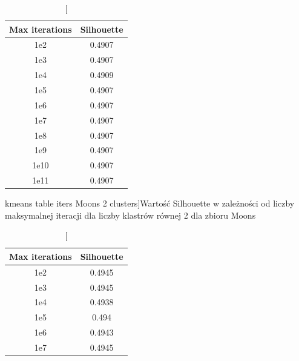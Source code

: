 \documentclass{classrep}
\begin{document}
{{%

            \begin{table}[!htbp]
                \begin{minipage}{.48\textwidth}
                    \centering
                    \begin{tabular}{|c|c|}
                        \hline
                        Max iterations & Silhouette \\ \hline
                        1e2 & 0.4907 \\ \hline
                        1e3 & 0.4907 \\ \hline
                        1e4 & 0.4909 \\ \hline
                        1e5 & 0.4907 \\ \hline
                        1e6 & 0.4907 \\ \hline
                        1e7 & 0.4907 \\ \hline
                        1e8 & 0.4907 \\ \hline
                        1e9 & 0.4907 \\ \hline
                        1e10 & 0.4907 \\ \hline
                        1e11 & 0.4907 \\ \hline
                    \end{tabular}
                    \caption
                    [kmeans table iters Moons 2 clusters]{Wartość Silhouette w
                    zależności od liczby maksymalnej iteracji dla liczby klastrów
                    równej 2 dla zbioru Moons}
                    \label{kmeans_table_iters_Moons_2_clusters}
                \end{minipage}
                \hfill
                \begin{minipage}{.48\textwidth}
                    \centering
                    \begin{tabular}{|c|c|}
                        \hline
                        Max iterations & Silhouette \\ \hline
                        1e2 & 0.4945 \\ \hline
                        1e3 & 0.4945 \\ \hline
                        1e4 & 0.4938 \\ \hline
                        1e5 & 0.494 \\ \hline
                        1e6 & 0.4943 \\ \hline
                        1e7 & 0.4945 \\ \hline

\end{tabular}
\end{minipage}
\end{table}}}
\end{document}
